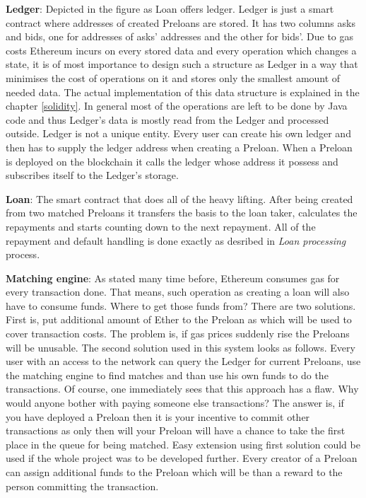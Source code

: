 \documentclass[a4paper,12pt,twoside,openany]{report}
\begin{document}
\textbf{Ledger}: Depicted in the figure as Loan offers ledger. Ledger is just a smart contract where addresses of created Preloans are stored. It has two columns asks and bids, one for addresses of asks' addresses and the other for bids'. Due to gas costs Ethereum incurs on every stored data and every operation which changes a state, it is of most importance to design such a structure as Ledger in a way that minimises the cost of operations on it and stores only the smallest amount of needed data. The actual implementation of this data structure is explained in the chapter \ref{solidity}. In general most of the operations are left to be done by Java code and thus Ledger's data is mostly read from the Ledger and processed outside. Ledger is not a unique entity. Every user can create his own ledger and then has to supply the ledger address when creating a Preloan. When a Preloan is deployed on the blockchain it calls the ledger whose address it possess and subscribes itself to the Ledger's storage.

\textbf{Loan}: The smart contract that does all of the heavy lifting. After being created from two matched Preloans it transfers the basis to the loan taker, calculates the repayments and starts counting down to the next repayment. All of the repayment and default handling is done exactly as desribed in \textit{Loan processing} process.

\textbf{Matching engine}: As stated many time before, Ethereum consumes gas for every transaction done. That means, such operation as creating a loan will also have to consume funds. Where to get those funds from? There are two solutions. First is, put additional amount of Ether to the Preloan as which will be used to cover transaction costs. The problem is, if gas prices suddenly rise the Preloans will be unusable. The second solution used in this system looks as follows. Every user with an access to the network can query the Ledger for current Preloans, use the matching engine to find matches and than use his own funds to do the transactions. Of course, one immediately sees that this approach has a flaw. Why would anyone bother with paying someone else transactions? The answer is, if you have deployed a Preloan then it is your incentive to commit other transactions as only then will your Preloan will have a chance to take the first place in the queue for being matched. Easy extension using first solution could be used if the whole project was to be developed further. Every creator of a Preloan can assign additional funds to the Preloan which will be than a reward to the person committing the transaction.
\end{document}
